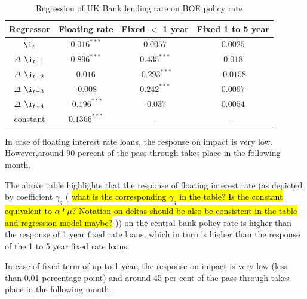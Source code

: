 \documentclass[12pt]{article}
\numberwithin{equation}{section}
\begin{document}
\begin {table}[H]
\label{regr_table_uk}
\caption {Regression of UK Bank lending rate on BOE policy rate} \label{tab:title} 
\begin{center}
	\begin{tabular}{||c c c c  ||} 
		\hline
		Regressor & Floating rate & Fixed $<$ 1 year& Fixed 1 to 5 year \\ [0.5ex] 
		\hline\hline
		$\i_{t}$ & $0.016^{***}$ & $0.0057$& $0.0025$ \\ 
		\hline
		$\Delta$ $\i_{t-1}$& $0.896^{***}$ & $0.435^{***}$& $0.018$  \\ 
		\hline
		 $\Delta$ $\i_{t-2}$&$0.016$ & -$0.293^{***}$& -$0.0158$\\
		
		\hline
	$\Delta$ $\i_{t-3}$	&  -$0.008$ & $0.242^{***}$& $0.0097$ \\
		\hline
		$\Delta$  $\i_{t-4}$&-$0.196^{***}$ &-$0.037$& $0.0054$ \\  
		\hline
		constant&$0.1366^{***}$ & - & -\\ 
			
			\hline
		
		\hline
		
	\end{tabular}

\end{center}

\end {table}



In case of floating interest rate loans, the response on impact is very low. However,around 90 percent of the pass through takes place in the following month.

The above table highlights that the response of floating interest rate (as depicted by coefficient $\gamma_{q}$ ( \hl{what is the corresponding $\gamma_q$ in the table? Is the constant equivalent to $\alpha * \mu$? Notation on deltas should be also be consistent in the table and regression model maybe? }))  on the central bank policy rate is higher than the response of 1 year fixed rate loans, which in turn is higher than the response of the 1 to 5 year fixed rate loans.

 In case of fixed term of up to 1 year, the response on impact is very low (less than 0.01 percentage point) and around 45 per cent of the pass through takes place in the following month. 
\end{document}

